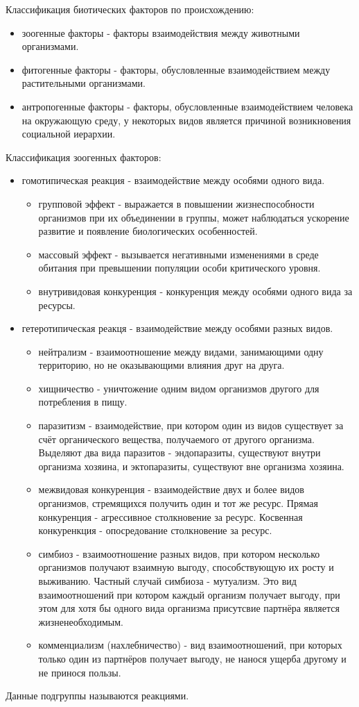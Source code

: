 Классификация биотических факторов по происхождению:
\begin{itemize}
\item зоогенные факторы - факторы взаимодействия между животными организмами.
\item фитогенные факторы - факторы, обусловленные взаимодействием между растительными организмами.
\item антропогенные факторы - факторы, обусловленные взаимодействием человека на окружающую среду, у некоторых видов является причиной возникновения социальной иерархии.
\end{itemize}

Классификация зоогенных факторов:
\begin{itemize}
\item гомотипическая реакция - взаимодействие между особями одного вида.
\begin{itemize}
	\item групповой эффект - выражается в повышении жизнеспособности организмов при их объединении в группы, может наблюдаться ускорение развитие и появление биологических особенностей.
	\item массовый эффект - вызывается негативными изменениями в среде обитания при превышении популяции особи критического уровня.
	\item внутривидовая конкуренция - конкуренция между особями одного вида за ресурсы.
\end{itemize}
\item гетеротипическая реакця - взаимодействие между особями разных видов.
\begin{itemize}
	\item нейтрализм - взаимоотношение между видами, занимающими одну территорию, но не оказывающими влияния друг на друга.
	\item хищничество - уничтожение одним видом организмов другого для потребления в пищу.
	\item паразитизм - взаимодействие, при котором один из видов существует за счёт органического вещества, получаемого от другого организма. Выделяют два вида паразитов - эндопаразиты, существуют внутри организма хозяина, и эктопаразиты, существуют вне организма хозяина.
	\item межвидовая конкуренция - взаимодействие двух и более видов организмов, стремящихся получить один и тот же ресурс. Прямая конкуренция - агрессивное столкновение за ресурс. Косвенная конкуренкция - опосредование столкновение за ресурс.
	\item симбиоз - взаимоотношение разных видов, при котором несколько организмов получают взаимную выгоду, способствующую их росту и выживанию. Частный случай симбиоза - мутуализм. Это вид взаимоотношений при котором каждый организм получает выгоду, при этом для хотя бы одного вида организма присутсвие партнёра является жизненеобходимым.
	\item комменциализм (нахлебничество) - вид взаимоотношений, при которых только один из партнёров получает выгоду, не нанося ущерба другому и не принося пользы.
\end{itemize}
\end{itemize}
Данные подгруппы называются реакциями.

